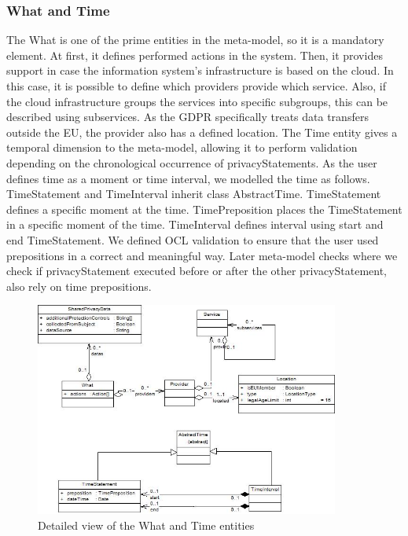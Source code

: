 \documentclass[11pt,english]{article}
\begin{document}
\subsubsection{What and Time}
The What is one of the prime entities in the meta-model, so it is a mandatory element. At first, it defines performed actions in the system. Then, it provides support in case the information system's infrastructure is based on the cloud. In this case, it is possible to define which providers provide which service. Also, if the cloud infrastructure groups the services into specific subgroups, this can be described using subservices. As the GDPR specifically treats data transfers outside the EU, the provider also has a defined location. \newline The Time entity gives a temporal dimension to the meta-model, allowing it to perform validation depending on the chronological occurrence of privacyStatements. As the user defines time as a moment or time interval, we modelled the time as follows. TimeStatement and TimeInterval inherit class AbstractTime. TimeStatement defines a specific moment at the time. TimePreposition places the TimeStatement in a specific moment of the time. TimeInterval defines interval using start and end TimeStatement. We defined OCL validation to ensure that the user used prepositions in a correct and meaningful way. Later meta-model checks where we check if privacyStatement executed before or after the other privacyStatement, also rely on time prepositions.
\begin{figure}[H]
    \centering
    \includegraphics[width=10cm,scale=0.5]{images/whatAndTime.jpg}
    \caption{Detailed view of the What and Time entities}
    \label{fig:WhatAndTime}
\end{figure}
\end{document}
